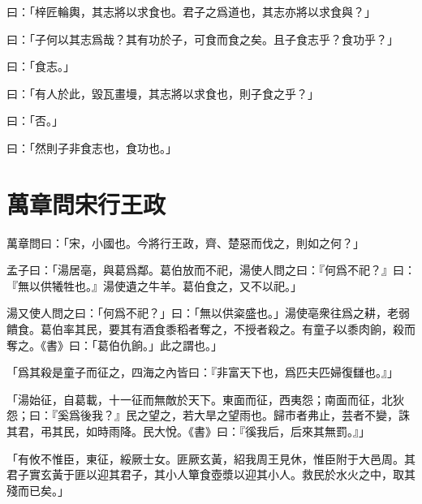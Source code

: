 曰：「梓匠輪輿，其志將以求食也。君子之爲道也，其志亦將以求食與？」

曰：「子何以其志爲哉？其有功於子，可食而食之矣。且子食志乎？食功乎？」

曰：「食志。」

曰：「有人於此，毀瓦畫墁，其志將以求食也，則子食之乎？」

曰：「否。」

曰：「然則子非食志也，食功也。」\par {}

\section{萬章問宋行王政}

萬章問曰：「宋，小國也。今將行王政，齊、楚惡而伐之，則如之何？」

孟子曰：「湯居亳，與葛爲鄰。葛伯放而不祀，湯使人問之曰：『何爲不祀？』曰：『無以供犧牲也。』湯使遺之牛羊。葛伯食之，又不以祀。」

湯又使人問之曰：「何爲不祀？」曰：「無以供粢盛也。」湯使亳衆往爲之耕，老弱饋食。葛伯率其民，要其有酒食黍稻者奪之，不授者殺之。有童子以黍肉餉，殺而奪之。《書》曰：「葛伯仇餉。」此之謂也。」

「爲其殺是童子而征之，四海之內皆曰：『非富天下也，爲匹夫匹婦復讎也。』」

「湯始征，自葛載，十一征而無敵於天下。東面而征，西夷怨；南面而征，北狄怨；曰：『奚爲後我？』民之望之，若大旱之望雨也。歸市者弗止，芸者不變，誅其君，弔其民，如時雨降。民大悅。《書》曰：『徯我后，后來其無罰。』」

「有攸不惟臣，東征，綏厥士女。匪厥玄黃，紹我周王見休，惟臣附于大邑周。其君子實玄黃于匪以迎其君子，其小人簞食壺漿以迎其小人。救民於水火之中，取其殘而已矣。」

